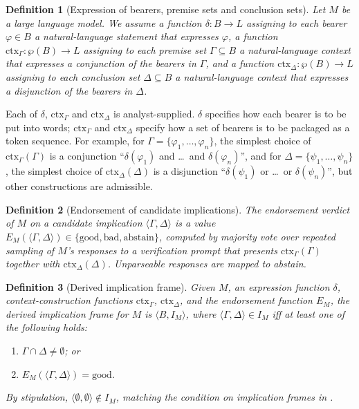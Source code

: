 \documentclass[11pt]{article}
\newtheorem{definition}{Definition}
\begin{document}
\begin{definition}[Expression of bearers, premise sets and conclusion sets]
Let $M$ be a large language model. We assume a function $\delta : B \to L$ assigning to each bearer $\varphi \in B$ a natural-language statement that expresses $\varphi$, a function $\mathrm{ctx}_\Gamma : \wp(B) \to L$ assigning to each premise set $\Gamma \subseteq B$ a natural-language context that expresses a conjunction of the bearers in $\Gamma$, and a function $\mathrm{ctx}_\Delta : \wp(B) \to L$ assigning to each conclusion set $\Delta \subseteq B$ a natural-language context that expresses a disjunction of the bearers in $\Delta$.
\end{definition}

Each of $\delta$, $\mathrm{ctx}_\Gamma$ and $\mathrm{ctx}_\Delta$ is analyst-supplied. $\delta$ specifies how each bearer is to be put into words; $\mathrm{ctx}_\Gamma$ and $\mathrm{ctx}_\Delta$ specify how a set of bearers is to be packaged as a token sequence. For example, for $\Gamma = \{\varphi_1, \ldots, \varphi_n\}$, the simplest choice of $\mathrm{ctx}_\Gamma(\Gamma)$ is a conjunction ``$\delta(\varphi_1)$ and \ldots\ and $\delta(\varphi_n)$'', and for $\Delta = \{\psi_1, \ldots, \psi_n\}$, the simplest choice of $\mathrm{ctx}_\Delta(\Delta)$ is a disjunction ``$\delta(\psi_1)$ or \ldots\ or $\delta(\psi_n)$'', but other constructions are admissible.

\begin{definition}[Endorsement of candidate implications]
The endorsement verdict of $M$ on a candidate implication $\langle \Gamma, \Delta \rangle$ is a value $E_M(\langle \Gamma, \Delta \rangle) \in \{\text{good}, \text{bad}, \text{abstain}\}$, computed by majority vote over repeated sampling of $M$'s responses to a verification prompt \cite{allen2025nesy} that presents $\mathrm{ctx}_\Gamma(\Gamma)$ together with $\mathrm{ctx}_\Delta(\Delta)$. Unparseable responses are mapped to abstain.
\end{definition}

\begin{definition}[Derived implication frame]
\label{def:frame}
Given $M$, an expression function $\delta$, context-construction functions $\mathrm{ctx}_\Gamma$, $\mathrm{ctx}_\Delta$, and the endorsement function $E_M$, the derived implication frame for $M$ is $\langle B, I_M \rangle$, where $\langle \Gamma, \Delta \rangle \in I_M$ iff at least one of the following holds:
\begin{enumerate}
\item[(i)] $\Gamma \cap \Delta \neq \emptyset$; or
\item[(ii)] $E_M(\langle \Gamma, \Delta \rangle) = \text{good}$.
\end{enumerate}
By stipulation, $\langle \emptyset, \emptyset \rangle \notin I_M$, matching the condition on implication frames in \cite[Def.~62]{hlobil2025}.
\end{definition}
\end{document}
